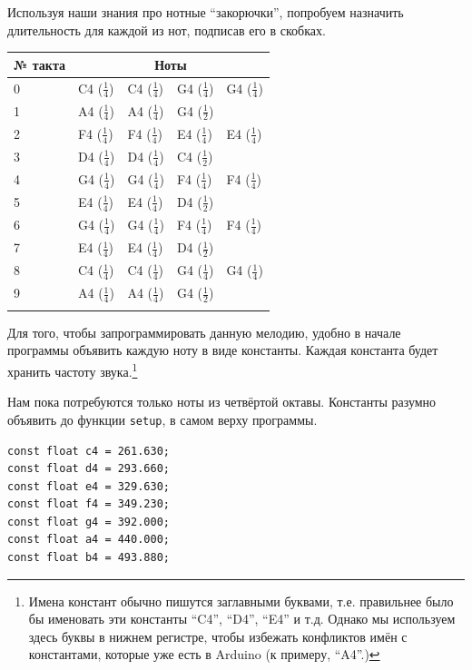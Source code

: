 \documentclass[a4paper,twoside]{book}
\begin{document}
Используя наши знания про нотные ``закорючки'', попробуем назначить длительность
для каждой из нот, подписав его в скобках.

\begin{tabular}{p{2cm}|p{2cm}|p{2cm}|p{2cm}|p{2cm}}
  № такта & \multicolumn{4}{c}{Ноты} \\
  \hline \hline
  0 & C4 ($\frac{1}{4}$) & C4 ($\frac{1}{4}$) & G4 ($\frac{1}{4}$) & G4 ($\frac{1}{4}$) \\
  \hline
  1 & A4 ($\frac{1}{4}$) & A4 ($\frac{1}{4}$) & G4 ($\frac{1}{2}$) & \\
  \hline
  2 & F4 ($\frac{1}{4}$) & F4 ($\frac{1}{4}$) & E4 ($\frac{1}{4}$) & E4 ($\frac{1}{4}$) \\
  \hline
  3 & D4 ($\frac{1}{4}$) & D4 ($\frac{1}{4}$) & C4 ($\frac{1}{2}$) & \\
  \hline
  4 & G4 ($\frac{1}{4}$) & G4 ($\frac{1}{4}$) & F4 ($\frac{1}{4}$) & F4 ($\frac{1}{4}$) \\
  \hline
  5 & E4 ($\frac{1}{4}$) & E4 ($\frac{1}{4}$) & D4 ($\frac{1}{2}$) & \\
  \hline
  6 & G4 ($\frac{1}{4}$) & G4 ($\frac{1}{4}$) & F4 ($\frac{1}{4}$) & F4 ($\frac{1}{4}$) \\
  \hline
  7 & E4 ($\frac{1}{4}$) & E4 ($\frac{1}{4}$) & D4 ($\frac{1}{2}$) & \\
  \hline
  8 & C4 ($\frac{1}{4}$) & C4 ($\frac{1}{4}$) & G4 ($\frac{1}{4}$) & G4 ($\frac{1}{4}$) \\
  \hline
  9 & A4 ($\frac{1}{4}$) & A4 ($\frac{1}{4}$) & G4 ($\frac{1}{2}$) & \\
  \hline
  \label{table:twinkle-twinkle-little-star-notes}
\end{tabular}

Для того, чтобы запрограммировать данную мелодию, удобно в начале программы
объявить каждую ноту в виде константы. Каждая константа будет хранить частоту
звука.\footnote{Имена констант обычно пишутся заглавными буквами, т.е.
правильнее было бы именовать эти константы ``C4'', ``D4'', ``E4'' и т.д. Однако мы
используем здесь буквы в нижнем регистре, чтобы избежать конфликтов имён с
константами, которые уже есть в Arduino (к примеру, ``A4''.)}

Нам пока потребуются только ноты из четвёртой октавы. Константы разумно объявить
до функции \texttt{setup}, в самом верху программы.

\begin{verbatim}
const float c4 = 261.630;
const float d4 = 293.660;
const float e4 = 329.630;
const float f4 = 349.230;
const float g4 = 392.000;
const float a4 = 440.000;
const float b4 = 493.880;
\end{verbatim}
\end{document}
